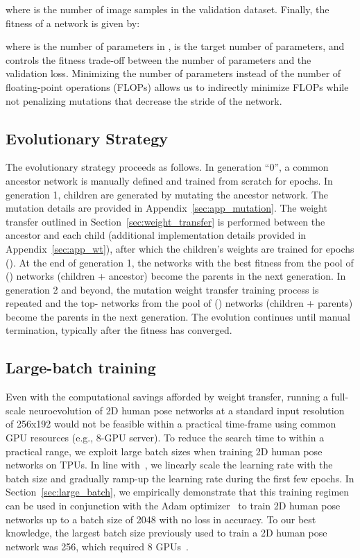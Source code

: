\documentclass{ieeeaccess}
\begin{document}
where  is the number of image samples in the validation dataset.
Finally, the fitness of a network  is given by:

where  is the number of parameters in ,  is the target number of parameters, and  controls the fitness trade-off between the number of parameters and the validation loss. Minimizing the number of parameters instead of the number of floating-point operations (FLOPs) allows us to indirectly minimize FLOPs while not penalizing mutations that decrease the stride of the network. 

\subsection{Evolutionary Strategy}
The evolutionary strategy proceeds as follows. In generation ``0'', a common ancestor network is manually defined and trained from scratch for  epochs. In generation 1,  children are generated by mutating the ancestor network. The mutation details are provided in Appendix~\ref{sec:app_mutation}. The weight transfer outlined in Section~\ref{sec:weight_transfer} is performed between the ancestor and each child (additional implementation details provided in Appendix~\ref{sec:app_wt}), after which the children's weights are trained for  epochs (). At the end of generation 1, the  networks with the best fitness from the pool of () networks (children + ancestor) become the parents in the next generation. In generation 2 and beyond, the mutation  weight transfer  training process is repeated and the top- networks from the pool of () networks (children + parents) become the parents in the next generation. The evolution continues until manual termination, typically after the fitness has converged. 

\subsection{Large-batch training}
Even with the computational savings afforded by weight transfer, running a full-scale neuroevolution of 2D human pose networks at a standard input resolution of 256x192 would not be feasible within a practical time-frame using common GPU resources (e.g., 8-GPU server). To reduce the search time to within a practical range, we exploit large batch sizes when training 2D human pose networks on TPUs. In line with~\cite{goyal2017accurate}, we linearly scale the learning rate with the batch size and gradually ramp-up the learning rate during the first few epochs. In Section~\ref{sec:large_batch}, we empirically demonstrate that this training regimen can be used in conjunction with the Adam optimizer~\cite{kingma2014adam} to train 2D human pose networks up to a batch size of 2048 with no loss in accuracy. To our best knowledge, the largest batch size previously used to train a 2D human pose network was 256, which required 8 GPUs~\cite{li2019rethinking}.
\end{document}
